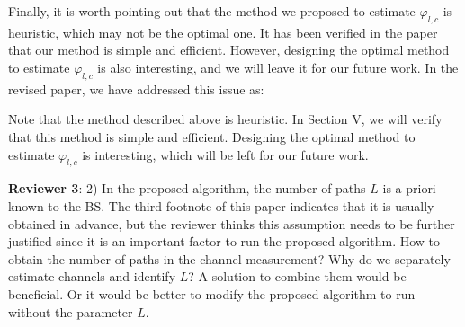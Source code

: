 \documentclass[a4paper,12pt]{article}
\begin{document}
{Finally, it is worth pointing out that the method we proposed to estimate ${{\varphi _{l,c}}}$ is heuristic, which may not be the optimal one. It has been verified in the paper that our method is simple and efficient. However, designing the optimal method to estimate ${{\varphi _{l,c}}}$ is also interesting, and we will leave it for our future work. In the revised paper, we have addressed this issue as:
\begin{framed}
{\color{red} Note that the method described above is heuristic. In Section V, we will verify that this method is simple and efficient. Designing the optimal method to estimate ${{\varphi _{l,c}}}$ is interesting, which will be left for our future work.}
\end{framed}
}



\textbf{Reviewer 3}: 2) In the proposed algorithm, the number of paths ${L}$ is a priori known to the BS. The third footnote of this paper indicates that it is usually obtained in advance, but the reviewer thinks this assumption needs to be further justified since it is an important factor to run the proposed algorithm. How to obtain the number of paths in the channel measurement? Why do we separately estimate channels and identify ${L}$? A solution to combine them would be beneficial. Or it would be better to modify the proposed algorithm to run without the parameter ${L}$.
\end{document}

